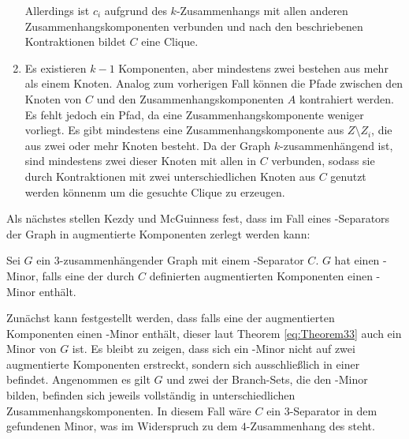\begin{beweis}
\begin{enumerate}
          Allerdings ist $c_i$ aufgrund des $k$-Zusammenhangs mit allen anderen Zusammenhangskomponenten verbunden und nach den beschriebenen Kontraktionen bildet $C$ eine Clique.
    \item Es existieren $k-1$ Komponenten, aber mindestens zwei bestehen aus mehr als einem Knoten.
          Analog zum vorherigen Fall können die Pfade zwischen den Knoten von $C$ und den Zusammenhangskomponenten $A$ kontrahiert werden.
          Es fehlt jedoch ein Pfad, da eine Zusammenhangskomponente weniger vorliegt.
          Es gibt mindestens eine Zusammenhangskomponente aus $Z \setminus Z_i$, die aus zwei oder mehr Knoten besteht.
          Da der Graph $k$-zusammenhängend ist, sind mindestens zwei dieser Knoten mit allen in $C$ verbunden, sodass sie durch Kontraktionen mit zwei unterschiedlichen Knoten aus $C$ genutzt werden könnenm um die gesuchte Clique zu erzeugen.
  \end{enumerate}
\end{beweis}

Als nächstes stellen Kezdy und McGuinness fest, dass im Fall eines \dd-Separators der Graph in augmentierte Komponenten zerlegt werden kann:
\begin{theorem}\label{eq:Theorem34}
  Sei $G$ ein $3$-zusammenhängender Graph mit einem \dd-Separator $C$.
  $G$ hat einen \kf-Minor, falls eine der durch $C$ definierten augmentierten Komponenten einen \kf-Minor enthält.
\end{theorem}
\begin{beweis}
  Zunächst kann festgestellt werden, dass falls eine der augmentierten Komponenten einen \kf-Minor enthält, dieser laut Theorem \ref{eq:Theorem33} auch ein Minor von $G$ ist.
  Es bleibt zu zeigen, dass sich ein \kf-Minor nicht auf zwei augmentierte Komponenten erstreckt, sondern sich ausschließlich in einer befindet.
  Angenommen es gilt \kf \minor $G$ und zwei der Branch-Sets, die den \kf-Minor bilden, befinden sich jeweils vollständig in unterschiedlichen Zusammenhangskomponenten.
  In diesem Fall wäre $C$ ein $3$-Separator in dem gefundenen Minor, was im Widerspruch zu dem $4$-Zusammenhang des \kf steht.
\end{beweis}

